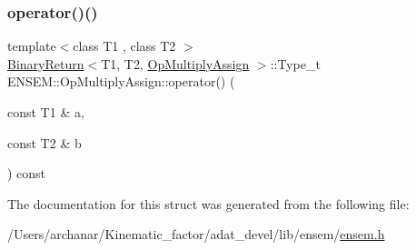 \mbox{\label{structENSEM_1_1OpMultiplyAssign_a066c102dbdd6eade3f255958de954a16}} 
\subsubsection{\texorpdfstring{operator()()}{operator()()}\hspace{0.1cm}{\footnotesize\ttfamily [2/2]}}
{\footnotesize\ttfamily template$<$class T1 , class T2 $>$ \\
\mbox{\hyperlink{structENSEM_1_1BinaryReturn}{Binary\+Return}}$<$T1, T2, \mbox{\hyperlink{structENSEM_1_1OpMultiplyAssign}{Op\+Multiply\+Assign}} $>$\+::Type\+\_\+t E\+N\+S\+E\+M\+::\+Op\+Multiply\+Assign\+::operator() (\begin{DoxyParamCaption}\item[{const T1 \&}]{a,  }\item[{const T2 \&}]{b }\end{DoxyParamCaption}) const\hspace{0.3cm}{\ttfamily [inline]}}



The documentation for this struct was generated from the following file\+:\begin{DoxyCompactItemize}
\item 
/\+Users/archanar/\+Kinematic\+\_\+factor/adat\+\_\+devel/lib/ensem/\mbox{\hyperlink{lib_2ensem_2ensem_8h}{ensem.\+h}}\end{DoxyCompactItemize}
